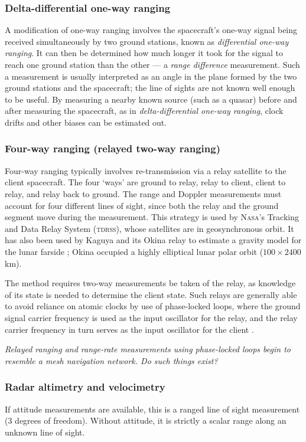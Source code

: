 \documentclass[12pt]{article}
\begin{document}
\subsubsection{Delta-differential one-way ranging}
A modification of one-way ranging involves the spacecraft's one-way signal being received simultaneously by two ground stations, known as \textit{differential one-way ranging}. It can then be determined how much longer it took for the signal to reach one ground station than the other --- a \textit{range difference} measurement. Such a measurement is usually interpreted as an angle in the plane formed by the two ground stations and the spacecraft; the line of sights are not known well enough to be useful. By measuring a nearby known source (such as a quasar) before and after measuring the spacecraft, as in \textit{delta-differential one-way ranging}, clock drifts and other biases can be estimated out.

\subsubsection{Four-way ranging (relayed two-way ranging)}
Four-way ranging typically involves re-transmission via a relay satellite to the client spacecraft. The four `ways' are ground to relay, relay to client, client to relay, and relay back to ground. The range and Doppler measurements must account for four different lines of sight, since both the relay and the ground segment move during the measurement. This strategy is used by \textsc{Nasa}'s Tracking and Data Relay System (\textsc{tdrss}), whose satellites are in geosynchronous orbit. It has also been used by Kaguya and its Okina relay to estimate a gravity model for the lunar farside \citep{Iwata2009}; Okina occupied a highly elliptical lunar polar orbit ($100\times2400$ km).

The method requires two-way measurements be taken of the relay, as knowledge of its state is needed to determine the client state. Such relays are generally able to avoid reliance on atomic clocks by use of phase-locked loops, where the ground signal carrier frequency is used as the input oscillator for the relay, and the relay carrier frequency in turn serves as the input oscillator for the client \citep{Iwata2009}.

\textit{Relayed ranging and range-rate measurements using phase-locked loops begin to resemble a mesh navigation network. Do such things exist?}

\subsubsection{Radar altimetry and velocimetry}
If attitude measurements are available, this is a ranged line of sight measurement (3 degrees of freedom). Without attitude, it is strictly a scalar range along an unknown line of sight.
\end{document}
